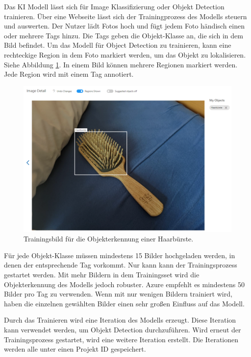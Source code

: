 Das KI Modell lässt sich für Image Klassifizierung oder Objekt Detection trainieren. Über eine Webseite lässt sich der Trainingprozess des Modells steuern und auswerten. Der Nutzer lädt Fotos hoch und fügt jedem Foto händisch einen oder mehrere Tags hinzu. Die Tags geben die Objekt-Klasse an, die sich in dem Bild befindet. Um das Modell für Object Detection zu trainieren, kann eine rechteckige Region in dem Foto markiert werden, um das Objekt zu lokalisieren. Siehe Abbildung \ref{img:trainingone}. In einem Bild können mehrere Regionen markiert werden. Jede Region wird mit einem Tag annotiert.

\begin{figure}[H]
	\centering
	\includegraphics[width=1\textwidth]{images/trainingone.png}
	\caption[]{Trainingsbild für die Objekterkennung einer Haarbürste.}
	\label{img:trainingone}
\end{figure}

Für jede Objekt-Klasse müssen mindestens 15 Bilder hochgeladen werden, in denen der entsprechende Tag vorkommt. Nur kann kann der Trainingsprozess gestartet werden. Mit mehr Bildern in dem Trainingsset wird die Objekterkennung des Modells jedoch robuster. Azure empfehlt es mindestens 50 Bilder pro Tag zu verwenden. Wenn mit nur wenigen Bildern trainiert wird, haben die einzelnen gewählten Bilder einen sehr großen Einfluss auf das Modell.

Durch das Trainieren wird eine Iteration des Modells erzeugt. Diese Iteration kann verwendet werden, um Objekt Detection durchzuführen. Wird erneut der Trainingsprozess gestartet, wird eine weitere Iteration erstellt. Die Iterationen werden alle unter einen Projekt ID gespeichert.

